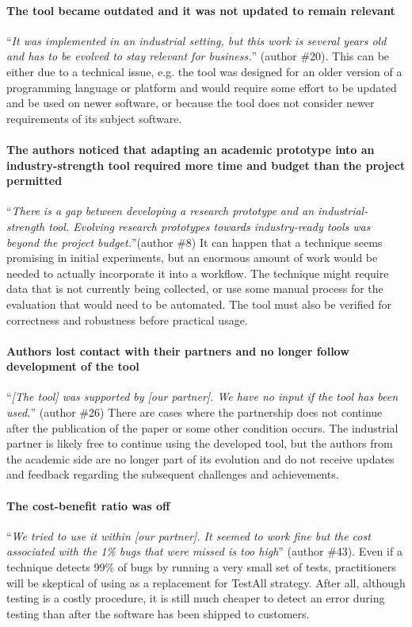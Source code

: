 \paragraph{The tool became outdated and it was not updated to remain relevant}
``\textit{It was implemented in an industrial setting, but this work is several years old and has to be evolved to stay relevant for business.}'' (author \#20).
This can be either due to a technical issue, e.g. the tool was designed for an older version of a programming language or platform and would require some effort to be updated and be used on newer software, or because the tool does not consider newer requirements of its subject software.

\paragraph{The authors noticed that adapting an academic prototype into an industry-strength tool required more time and budget than the project permitted}
``\textit{There is a gap between developing a research prototype and an industrial-strength tool. Evolving research prototypes towards industry-ready tools was beyond the project budget.}''(author \#8)
It can happen that a technique seems promising in initial experiments, but an enormous amount of work would be needed to actually incorporate it into a workflow.
The technique might require data that is not currently being collected, or use some manual process for the evaluation that would need to be automated.
The tool must also be verified for correctness and robustness before practical usage.

\paragraph{Authors lost contact with their partners and no longer follow development of the tool}
``\textit{[The tool] was supported by [our partner]. We have no input if the tool has been used.}'' (author \#26)
There are cases where the partnership does not continue after the publication of the paper or some other condition occurs.
The industrial partner is likely free to continue using the developed tool, but the authors from the academic side are no longer part of its evolution and do not receive updates and feedback regarding the subsequent challenges and achievements.

\paragraph{The cost-benefit ratio was off}
``\textit{We tried to use it within [our partner]. It seemed to work fine but the cost associated with the 1\% bugs that were missed is too high}'' (author \#43).
Even if a \tcs technique detects 99\% of bugs by running a very small set of tests, practitioners will be skeptical of using as a replacement for TestAll strategy.
After all, although testing is a costly procedure, it is still much cheaper to detect an error during testing than after the software has been shipped to customers.

